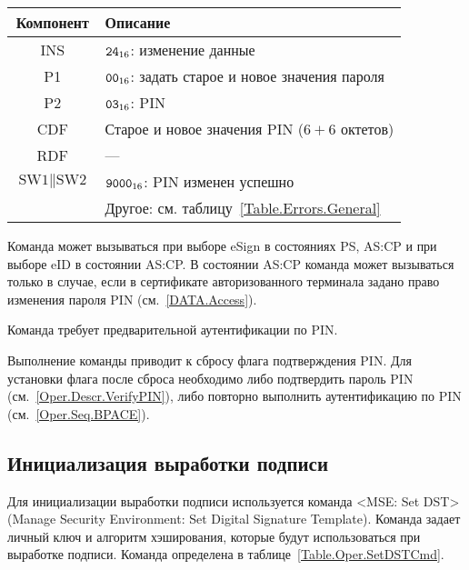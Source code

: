 \begin{table}[hbt]
\caption{}\label{Table.Oper.ChangePINCmd}
\begin{tabular}{|c|p{14cm}|}
\hline
Компонент & 	Описание \\
\hline
\hline
INS & $\texttt{24}_{16}$: изменение данные\\
\hline
P1 & $\texttt{00}_{16}$: задать старое и новое значения пароля\\
\hline
P2 & $\texttt{03}_{16}$: PIN \\
\hline
CDF & Старое и новое значения PIN ($6 + 6$ октетов)\\ 
\hline 
\hline
RDF & 	 --- \\
\hline
$\text{SW1}\parallel\text{SW2}$ & 
 $\texttt{9000}_{16}$: PIN изменен успешно \\
\cline{2-2}
  & Другое: см. таблицу~\ref{Table.Errors.General}\\
\hline
\end{tabular}
\end{table}

Команда может вызываться при выборе eSign в состояниях 
PS, AS:CP и при выборе eID в состоянии AS:CP. 
В состоянии AS:CP команда может вызываться только в случае, 
если в сертификате  авторизованного терминала задано 
право изменения пароля PIN (см.~\ref{DATA.Access}).

Команда требует предварительной аутентификации по PIN. 

Выполнение команды приводит к сбросу флага подтверждения PIN.
Для установки флага после сброса необходимо либо подтвердить пароль PIN 
(см.~\ref{Oper.Descr.VerifyPIN}), либо повторно выполнить аутентификацию по PIN 
(см.~\ref{Oper.Seq.BPACE}). 


\subsection{Инициализация выработки подписи}
\label{Oper.Descr.SetDST}

Для инициализации выработки подписи используется команда     
<MSE: Set DST> (Manage Security Environment: Set Digital Signature Template). 
Команда задает личный ключ и алгоритм хэширования, которые будут использоваться 
при выработке подписи.
%
Команда определена в таблице~\ref{Table.Oper.SetDSTCmd}.


